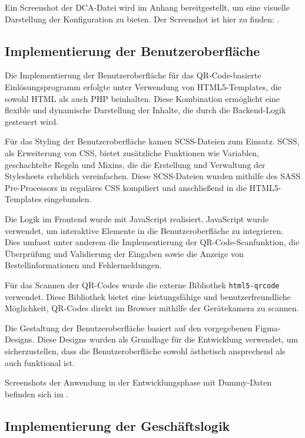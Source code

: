 Ein Screenshot der DCA-Datei wird im Anhang bereitgestellt, um eine visuelle Darstellung der Konfiguration zu bieten. Der Screenshot ist hier zu finden: .

\subsection{Implementierung der Benutzeroberfläche}
\label{sec:ImplementierungBenutzeroberflaeche}

Die Implementierung der Benutzeroberfläche für das QR-Code-basierte Einlösungsprogramm erfolgte unter Verwendung von HTML5-Templates, die sowohl HTML als auch PHP beinhalten. Diese Kombination ermöglicht eine flexible und dynamische Darstellung der Inhalte, die durch die Backend-Logik gesteuert wird.

Für das Styling der Benutzeroberfläche kamen SCSS-Dateien zum Einsatz. SCSS, als Erweiterung von CSS, bietet zusätzliche Funktionen wie Variablen, geschachtelte Regeln und Mixins, die die Erstellung und Verwaltung der Stylesheets erheblich vereinfachen. Diese SCSS-Dateien wurden mithilfe des SASS Pre-Processors in reguläres CSS kompiliert und anschließend in die HTML5-Templates eingebunden.

Die Logik im Frontend wurde mit JavaScript realisiert. JavaScript wurde verwendet, um interaktive Elemente in die Benutzeroberfläche zu integrieren. Dies umfasst unter anderem die Implementierung der QR-Code-Scanfunktion, die Überprüfung und Validierung der Eingaben sowie die Anzeige von Bestellinformationen und Fehlermeldungen.

Für das Scannen der QR-Codes wurde die externe Bibliothek \texttt{html5-qrcode} verwendet. Diese Bibliothek bietet eine leistungsfähige und benutzerfreundliche Möglichkeit, QR-Codes direkt im Browser mithilfe der Gerätekamera zu scannen.

Die Gestaltung der Benutzeroberfläche basiert auf den vorgegebenen Figma-Designs. Diese Designs wurden als Grundlage für die Entwicklung verwendet, um sicherzustellen, dass die Benutzeroberfläche sowohl ästhetisch ansprechend als auch funktional ist.

Screenshots der Anwendung in der Entwicklungsphase mit Dummy-Daten befinden sich im .


\subsection{Implementierung der Geschäftslogik}
\label{sec:ImplementierungGeschaeftslogik}

